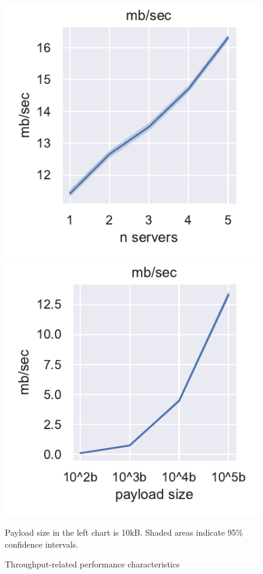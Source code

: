 \begin{figure}
	\centering
	\begin{minipage}{.45\linewidth}
		\includegraphics[width=\linewidth]{resources/servers_mb_sec}
	\end{minipage}
	\hspace{0.05\linewidth}
	\begin{minipage}{.45\linewidth}
		\includegraphics[width=\linewidth]{resources/payload_mb_sec}
	\end{minipage}
	\caption{Throughput-related performance characteristics}
	{Payload size in the left chart is 10kB. Shaded areas indicate 95\% confidence intervals.}
	\label{fig:perf:throughput}
\end{figure}

